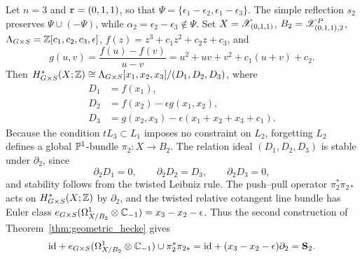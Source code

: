 Let $n=3$ and $\mathtt r=(0,1,1)$, so that
$\Psi=\{\epsilon_1-\epsilon_2,\epsilon_1-\epsilon_3\}$.
The simple reflection $s_2$ preserves $\Psi\cup(-\Psi)$, while $\alpha_2=\epsilon_2-\epsilon_3\notin\Psi$.
Set $X=\mathscr X_{(0,1,1)}$, $B_2=\mathscr X_{(0,1,1),2}^P$, $\Lambda_{G\times S}=\mathbb Z[c_1,c_2,c_3,\epsilon]$, $f(z)=z^3+c_1z^2+c_2z+c_3$, and
\[
 g(u,v)=\frac{f(u)-f(v)}{u-v}
       =u^2+uv+v^2+c_1(u+v)+c_2.
\]
Then $H^*_{G\times S}(X;\mathbb Z)\cong\Lambda_{G\times S}[x_1,x_2,x_3]/(D_1,D_2,D_3)$, where
\[
 \begin{aligned}
 D_1&=f(x_1),\\
 D_2&=f(x_2)-\epsilon g(x_1,x_2),\\
 D_3&=g(x_2,x_3)-\epsilon(x_1+x_2+x_3+c_1).
 \end{aligned}
\]
Because the condition $tL_3\subset L_1$ imposes no constraint on $L_2$, forgetting $L_2$
defines a global $\mathbb P^1$-bundle $\pi_2:X\to B_2$.
The relation ideal $(D_1,D_2,D_3)$ is stable under $\partial_2$, since
\[
 \partial_2D_1=0,\qquad \partial_2D_2=D_3,\qquad \partial_2D_3=0,
\]
and stability follows from the twisted Leibniz rule.
The push--pull operator $\pi_2^*\pi_{2*}$ acts on $H^*_{G\times S}(X;\mathbb Z)$ by $\partial_2$, and the twisted relative cotangent line bundle has Euler class
$e_{G\times S}(\Omega^1_{X/B_2}\otimes\mathbb C_{-1})=x_3-x_2-\epsilon$.
Thus the second construction of Theorem~\ref{thm:geometric_hecke} gives
\[
 \mathrm{id}+e_{G\times S}(\Omega^1_{X/B_2}\otimes\mathbb C_{-1})\cup\pi_2^*\pi_{2*}
 =\mathrm{id}+(x_3-x_2-\epsilon)\partial_2=\mathbf S_2.
\]
